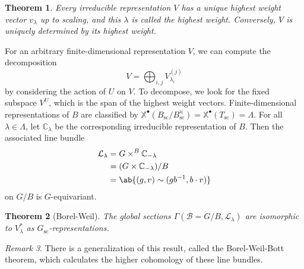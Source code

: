 \documentclass{amsart}
\newtheorem{thm}{Theorem}[section]
\theoremstyle{definition}
\theoremstyle{remark}
\newtheorem{rmk}[thm]{Remark}
\theoremstyle{plain}
\theoremstyle{definition}
\theoremstyle{remark}
\newcommand{\C}{\mathbb{C}}
\newcommand{\X}{\mathbb{X}}
\newcommand{\mc}[1]{\mathcal{#1}}
\newcommand{\on}[1]{\operatorname{#1}}
\newcommand{\1}{\mathbf{1}}
\newcommand{\2}{\mathbf{2}}
\newcommand{\3}{\mathbf{3}}
\begin{document}
\begin{thm}
    Every irreducible representation \(V\) has a unique highest weight vector \(v_{\lambda}\) up to scaling, and this \(\lambda\) is called the \textit{highest weight}. Conversely, \(V\) is uniquely determined by its highest weight.
\end{thm}

For an arbitrary finite-dimensional representation \(V\), we can compute the decomposition
\[ V = \bigoplus_{i,j} V_{\lambda_i}^{(j)} \]
by considering the action of \(U\) on \(V\). To decompose, we look for the fixed subspace \(V^U\), which is the span of the highest weight vectors. Finite-dimensional representations of \(B\) are classified by \(\X^{\bullet}(B_{\on{sc}}/B_{\on{sc}}^u) = \X^{\bullet}(T_{\on{sc}}) = \Lambda\). For all \(\lambda \in \Lambda\), let \(\C_{\lambda}\) be the corresponding irreducible representation of \(B\). Then the associated line bundle
\begin{align*}
    \mc{L}_{\lambda} &= G \times^B \C_{-\lambda} \\
    &= (G \times \C_{-\lambda}) / B \\
    &= \ab\{ (g, v) \sim (gb^{-1}, b \cdot v) \}
\end{align*}
on \(G / B\) is \(G\)-equivariant. 

\begin{thm}[Borel-Weil]
    The global sections \(\Gamma (\mc{B} = G/B, \mc{L}_{\lambda})\) are isomorphic to \(V_{\lambda}^*\) as \(G_{\on{sc}}\)-representations.
\end{thm}

\begin{rmk}
    There is a generalization of this result, called the Borel-Weil-Bott theorem, which calculates the higher cohomology of these line bundles.
\end{rmk}
\end{document}

